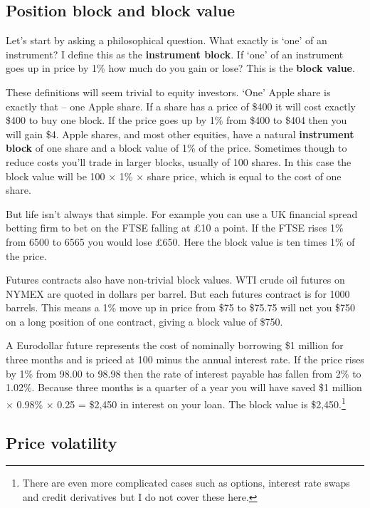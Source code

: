 \subsection*{Position block and block value}

Let's start by asking a philosophical question. What exactly is ‘one' of an instrument? I define this as the \textbf{instrument block}. If ‘one' of an instrument goes up in price by 1\% how much do you gain or lose? This is the \textbf{block value}.

These definitions will seem trivial to equity investors. ‘One' Apple share is exactly that -- one Apple share. If a share has a price of \$400 it will cost exactly \$400 to buy one block. If the price goes up by 1\% from \$400 to \$404 then you will gain \$4. Apple shares, and most other equities, have a natural \textbf{instrument block} of one share and a block value of 1\% of the price. Sometimes though to reduce costs you'll trade in larger blocks, usually of 100 shares. In this case the block value will be 100 × 1\% × share price, which is equal to the cost of one share.

But life isn't always that simple. For example you can use a UK financial spread betting firm to bet on the FTSE falling at £10 a point. If the FTSE rises 1\% from 6500 to 6565 you would lose £650. Here the block value is ten times 1\% of the price.

Futures contracts also have non-trivial block values. WTI crude oil futures on NYMEX are quoted in dollars per barrel. But each futures contract is for 1000 barrels. This means a 1\% move up in price from \$75 to \$75.75 will net you \$750 on a long position of one contract, giving a block value of \$750.

A Eurodollar future represents the cost of nominally borrowing \$1 million for three months and is priced at 100 minus the annual interest rate. If the price rises by 1\% from 98.00 to 98.98 then the rate of interest payable has fallen from 2\% to 1.02\%. Because three months is a quarter of a year you will have saved \$1 million × 0.98\% × 0.25 = \$2,450 in interest on your loan. The block value is \$2,450.\footnote{There are even more complicated cases such as options, interest rate swaps and credit derivatives but I do not cover these here.}

\subsection*{Price volatility}

